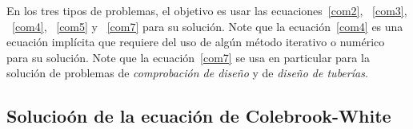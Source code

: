 \documentclass[11pt, oneside]{article}
\begin{document}
En los tres tipos de problemas, el objetivo es usar las ecuaciones~\ref{com2}, ~\ref{com3}, ~\ref{com4}, ~\ref{com5} y ~\ref{com7} para su soluci\'on. Note que la ecuaci\'on~\ref{com4} es una ecuaci\'on impl\'icita que requiere del uso de alg\'un m\'etodo iterativo o num\'erico para su soluci\'on. Note que la ecuaci\'on~\ref{com7} se usa en particular para la soluci\'on de problemas de \emph{comprobaci\'on de dise\~no} y de \emph{dise\~no de tuber\'ias}.


%
%
%
%
\subsection{Solucio\'on de la ecuaci\'on de Colebrook-White}
\end{document}
